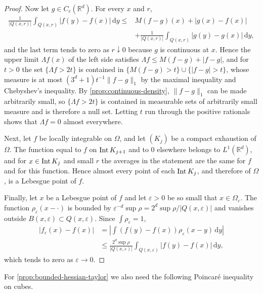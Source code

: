 \begin{proof}
Now let $g\in C_c(\mathbb R^d)$. For every $x$ and $r$,
\[
\begin{split}
 \frac1{|Q(x,r)|}\int_{Q(x,r)}|f(y)-f(x)|\,\mathrm dy\leq{}&M(f-g)(x)+|g(x)-f(x)|\\
 &+\frac1{|Q(x,r)|}\int_{Q(x,r)}|g(y)-g(x)|\,\mathrm dy,
\end{split}
\]
and the last term tends to zero as $r\downarrow0$ because $g$ is continuous at $x$. Hence the upper limit $\Lambda f(x)$ of the left side satisfies $\Lambda f\leq M(f-g)+|f-g|$, and for $t>0$ the set $\{\Lambda f>2t\}$ is contained in $\{M(f-g)>t\}\cup\{|f-g|>t\}$, whose measure is at most $(3^d+1)t^{-1}\|f-g\|_1$ by the maximal inequality and Chebyshev's inequality. By \cref{prop:continuous-density}, $\|f-g\|_1$ can be made arbitrarily small, so $\{\Lambda f>2t\}$ is contained in measurable sets of arbitrarily small measure and is therefore a null set. Letting $t$ run through the positive rationals shows that $\Lambda f=0$ almost everywhere.

Next, let $f$ be locally integrable on $\Omega$, and let $(K_j)$ be a compact exhaustion of $\Omega$. The function equal to $f$ on $\operatorname{Int} K_{j+1}$ and to $0$ elsewhere belongs to $L^1(\mathbb R^d)$, and for $x\in\operatorname{Int} K_j$ and small $r$ the averages in the statement are the same for $f$ and for this function. Hence almost every point of each $\operatorname{Int} K_j$, and therefore of $\Omega$, is a Lebesgue point of $f$.

Finally, let $x$ be a Lebesgue point of $f$ and let $\varepsilon>0$ be so small that $x\in\Omega_\varepsilon$. The function $\rho_\varepsilon(x-\cdot)$ is bounded by $\varepsilon^{-d}\sup\rho=2^d\sup\rho/|Q(x,\varepsilon)|$ and vanishes outside $B(x,\varepsilon)\subset Q(x,\varepsilon)$. Since $\int\rho_\varepsilon=1$,
\[
\begin{split}
 |f_\varepsilon(x)-f(x)|&=\left|\int(f(y)-f(x))\rho_\varepsilon(x-y)\,\mathrm dy\right|\\
 &\leq\frac{2^d\sup\rho}{|Q(x,\varepsilon)|}\int_{Q(x,\varepsilon)}|f(y)-f(x)|\,\mathrm dy,
\end{split}
\]
which tends to zero as $\varepsilon\to0$.
\end{proof}

For \cref{prop:bounded-hessian-taylor} we also need the following Poincar\'e inequality on cubes.


